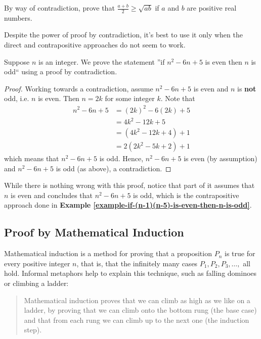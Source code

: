 \begin{exercise}
    By way of contradiction, prove that $\frac{a+b}{2} \geq \sqrt{ab}$ if $a$ and $b$ are positive real numbers.
\end{exercise}

Despite the power of proof by contradiction, it's best to use it only when the direct and contrapositive approaches do not seem to work.
\begin{example}
    Suppose $n$ is an integer. We prove the statement ''if $n^2 - 6n + 5$ is even then $n$ is odd`` using a proof by contradiction.
    \begin{proof}
        Working towards a contradiction, assume $n^2 - 6n + 5$ is even and $n$ is \textbf{not} odd, i.e. $n$ is even. Then $n = 2k$ for some integer $k$. Note that
        \begin{align*}
            n^2 - 6n + 5 &= (2k)^2 - 6(2k) + 5\\
            &= 4k^2 - 12k + 5\\
            &= (4k^2 - 12k + 4) + 1\\
            &= 2(2k^2 - 5k + 2) + 1
        \end{align*}
        which means that $n^2 - 6n + 5$ is odd. Hence, $n^2 - 6n + 5$ is even (by assumption) and $n^2 - 6n + 5$ is odd (as above), a contradiction.
    \end{proof}
    While there is nothing wrong with this proof, notice that part of it assumes that $n$ is even and concludes that  $n^2 - 6n + 5$ is odd, which is the contrapositive approach done in \textbf{Example \ref{example-if-(n-1)(n-5)-is-even-then-n-is-odd}}.
\end{example}

\subsection{Proof by Mathematical Induction}
Mathematical induction is a method for proving that a proposition $P_n$ is true for every positive integer $n$, that is, that the infinitely many cases $P_1, P_2, P_3, \dots,$ all hold. Informal metaphors help to explain this technique, such as falling dominoes or climbing a ladder:
\begin{quote}
    Mathematical induction proves that we can climb as high as we like on a ladder, by proving that we can climb onto the bottom rung (the base case) and that from each rung we can climb up to the next one (the induction step).
\end{quote}

